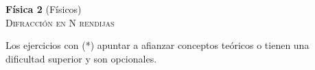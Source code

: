 \documentclass[11pt,spanish,a4paper]{article}
\begin{document}
\begin{center}
\textbf{Física 2} (Físicos) \hfill {}\\
	\textsc{\LARGE Difracción en N rendijas}
\end{center}

Los ejercicios con (*) apuntar a afianzar conceptos teóricos o tienen una dificultad superior y son opcionales.


\begin{enumerate}






\end{enumerate}
\end{document}
